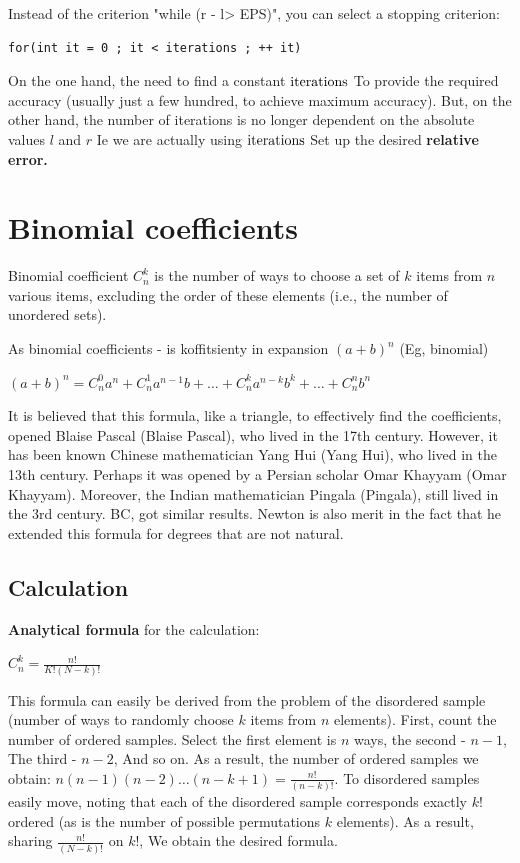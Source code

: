 Instead of the criterion "while (r - l> EPS)", you can select a stopping criterion:
\begin{verbatim}
for(int it = 0 ; it < iterations ; ++ it)
\end{verbatim}
On the one hand, the need to find a constant $\rm iterations$ To provide the required accuracy (usually just a few hundred, to achieve maximum accuracy). But, on the other hand, the number of iterations is no longer dependent on the absolute values $l$ and $r$ Ie we are actually using $\rm iterations$ Set up the desired \textbf{relative error.}

\section{ Binomial coefficients }
Binomial coefficient $C_n ^ k$ is the number of ways to choose a set of $k$ items from $n$ various items, excluding the order of these elements (i.e., the number of unordered sets).

As binomial coefficients - is koffitsienty in expansion $(a + b) ^ n$ (Eg, binomial)

$(a+b)^{n}=C_{n}^{0}a^{n}+C_{n}^{1}a^{n-1}b+\ldots+C_{n}^{k}a^{n-k}b^{k}+\ldots+C_{n}^{n}b^{n}$

It is believed that this formula, like a triangle, to effectively find the coefficients, opened Blaise Pascal (Blaise Pascal), who lived in the 17th century. However, it has been known Chinese mathematician Yang Hui (Yang Hui), who lived in the 13th century. Perhaps it was opened by a Persian scholar Omar Khayyam (Omar Khayyam). Moreover, the Indian mathematician Pingala (Pingala), still lived in the 3rd century. BC, got similar results. Newton is also merit in the fact that he extended this formula for degrees that are not natural.

\subsection{ Calculation }

\textbf{Analytical formula} for the calculation:

$C_n ^ k = \frac {n!} {K! (N-k)!}$

This formula can easily be derived from the problem of the disordered sample (number of ways to randomly choose $k$ items from $n$ elements). First, count the number of ordered samples. Select the first element is $n$ ways, the second - $n-1$, The third - $n-2$, And so on. As a result, the number of ordered samples we obtain: $n (n-1) (n-2) \ldots (n-k +1) = \frac {n!} {(n-k)!}$. To disordered samples easily move, noting that each of the disordered sample corresponds exactly $k!$ ordered (as is the number of possible permutations $k$ elements). As a result, sharing $\frac {n!} {(N-k)!}$ on $k!$, We obtain the desired formula.

